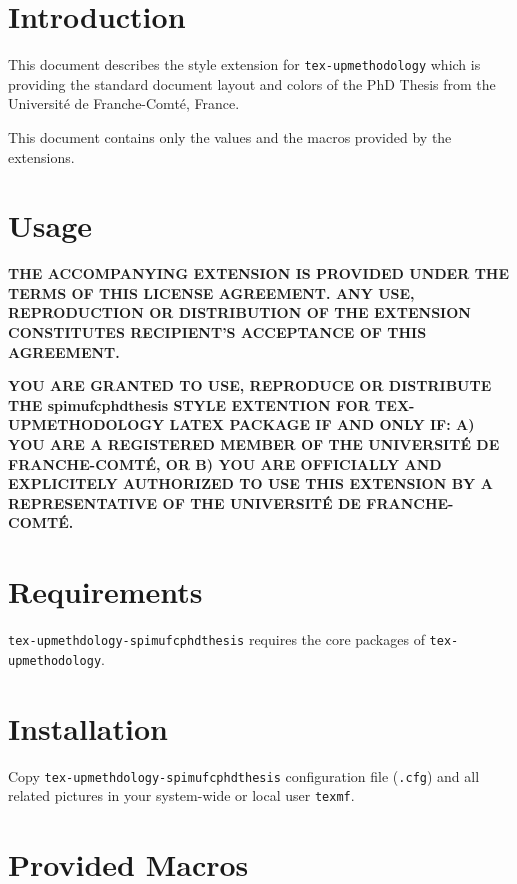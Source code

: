 \documentclass[article,english]{upmethodology-document}
\begin{document}
\section{Introduction}

This document describes the style extension for \texttt{tex-upmethodology} which is providing the standard document layout and colors of the PhD Thesis from the Universit\'e de Franche-Comt\'e, France.

This document contains only the values and the macros provided by the extensions.

\section{Usage}

\textbf{THE ACCOMPANYING EXTENSION IS PROVIDED UNDER THE TERMS OF THIS LICENSE AGREEMENT. ANY USE, REPRODUCTION OR DISTRIBUTION OF THE EXTENSION CONSTITUTES RECIPIENT'S ACCEPTANCE OF THIS AGREEMENT.}

\textbf{YOU ARE GRANTED TO USE, REPRODUCE OR DISTRIBUTE THE spimufcphdthesis STYLE EXTENTION FOR TEX-UPMETHODOLOGY LATEX PACKAGE IF AND ONLY IF: A) YOU ARE A REGISTERED MEMBER OF THE UNIVERSIT\'E DE FRANCHE-COMT\'E, OR B) YOU ARE OFFICIALLY AND EXPLICITELY AUTHORIZED TO USE THIS EXTENSION BY A REPRESENTATIVE OF THE UNIVERSIT\'E DE FRANCHE-COMT\'E.}

\section{Requirements}

\texttt{tex-upmethdology-spimufcphdthesis} requires the core packages of \texttt{tex-upmethodology}.

\section{Installation}

Copy \texttt{tex-upmethdology-spimufcphdthesis} configuration file (\texttt{.cfg}) and all related pictures in your system-wide or local user \texttt{texmf}.

\section{Provided Macros}
\end{document}
